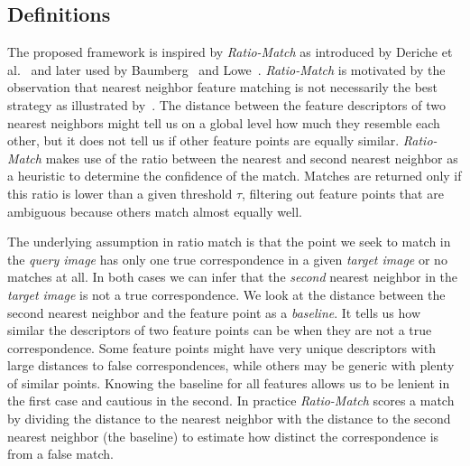 \documentclass[review]{elsarticle}
\begin{document}
\subsection{Definitions}
%
The proposed framework is inspired by \emph{Ratio-Match} as introduced by Deriche et al.\ \cite{deriche1994robust} and later used by Baumberg~\cite{baumberg2000reliable} and Lowe~\cite{lowe2004sift}. \emph{Ratio-Match} is motivated by the observation that nearest neighbor feature matching is not necessarily the best strategy as illustrated by~\cite{lowe2004sift, mikolajczyk2005performance}. The distance between the feature descriptors of two nearest neighbors might tell us on a global level how much they resemble each other, but it does not tell us if other feature points are equally similar. \emph{Ratio-Match} makes use of the ratio between the nearest and second nearest neighbor as a heuristic to determine the confidence of the match. Matches are returned only if this ratio is lower than a given threshold $\tau$, filtering out feature points that are ambiguous because others match almost equally well.

The underlying assumption in ratio match is that the point we seek to match in the \emph{query image} has only one true correspondence in a given \emph{target image} or no matches at all. In both cases we can infer that the \emph{second} nearest neighbor in the \emph{target image} is not a true correspondence. We look at the distance between the second nearest neighbor and the feature point as a \emph{baseline}. It tells us how similar the descriptors of two feature points can be when they are not a true correspondence. Some feature points might have very unique descriptors with large distances to false correspondences, while others may be generic with plenty of similar points. Knowing the baseline for all features allows us to be lenient in the first case and cautious in the second. In practice \emph{Ratio-Match} scores a match by dividing the distance to the nearest neighbor with the distance to the second nearest neighbor (the baseline) to estimate how distinct the correspondence is from a false match.  
\end{document}
